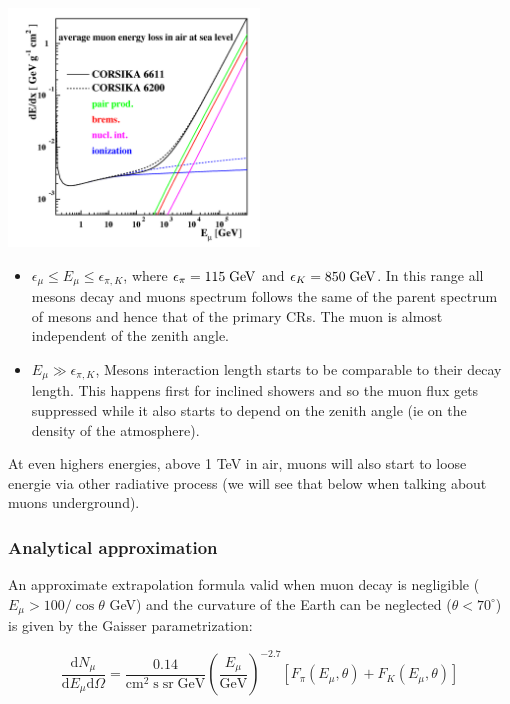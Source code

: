 \documentclass[
  letterpaper,
  DIV=11,
  numbers=noendperiod]{scrreprt}
\begin{document}
\begin{center}
\includegraphics[width=0.5\textwidth,height=\textheight]{images/muon_energylosses_air.png}
\end{center}

\begin{itemize}
\item
  \(\epsilon_\mu \leq E_\mu \leq \epsilon_{\pi,K}\), where
  \(\epsilon_\pi = 115 {\;\rm GeV}\) and
  \(\epsilon_K = 850 {\;\rm GeV}\). In this range all mesons decay and
  muons spectrum follows the same of the parent spectrum of mesons and
  hence that of the primary CRs. The muon is almost independent of the
  zenith angle.
\item
  \(E_\mu \gg \epsilon_{\pi,K}\), Mesons interaction length starts to be
  comparable to their decay length. This happens first for inclined
  showers and so the muon flux gets suppressed while it also starts to
  depend on the zenith angle (ie on the density of the atmosphere).
\end{itemize}

At even highers energies, above 1 TeV in air, muons will also start to
loose energie via other radiative process (we will see that below when
talking about muons underground).

\subsubsection{Analytical approximation}\label{analytical-approximation}

An approximate extrapolation formula valid when muon decay is negligible
(\(E_\mu > 100/\cos\theta\) GeV) and the curvature of the Earth can be
neglected (\(\theta < 70^{\circ}\)) is given by the Gaisser
parametrization:

\[\frac{\mathrm{d}N_\mu}{\mathrm{d}E_\mu \mathrm{d}\Omega} = \frac{0.14}{\mathrm{cm^2\;s\;sr\;GeV}}\left(\frac{E_\mu}{\mathrm{GeV}}\right)^{-2.7}\left[F_\pi(E_\mu, \theta) + F_K(E_\mu,\theta)\right]\]
\end{document}
